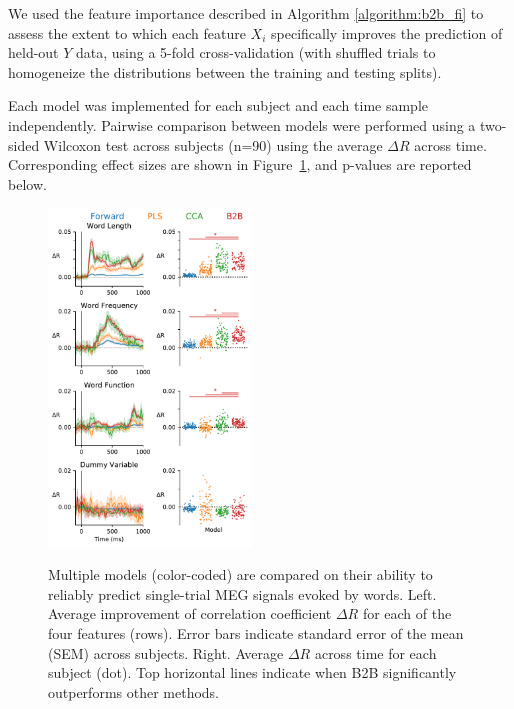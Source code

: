 We used the feature importance described in Algorithm \ref{algorithm:b2b_fi} to assess the extent to which each feature $X_i$ specifically improves the prediction of held-out $Y$ data, using a 5-fold cross-validation (with shuffled trials to homogeneize the distributions between the training and testing splits).

Each model was implemented for each subject and each time sample independently. Pairwise comparison between models were performed using a two-sided Wilcoxon test across subjects (n=90) using the average $\Delta R$ across time. Corresponding effect sizes are shown in Figure~\ref{fig:meg_results}, and p-values are reported below.



\begin{figure}
  \vspace{-11ex}
  \begin{center}
    \includegraphics[width=0.48\textwidth, trim=0cm 0cm 0cm 0cm, clip=True]{figures/meg.pdf}

    \label{fig:meg_results}
  \end{center}
  \caption{Multiple models (color-coded) are compared on their ability to reliably predict single-trial MEG signals evoked by words. Left. Average improvement of correlation coefficient $\Delta R$ for each of the four features (rows). Error bars indicate standard error of the mean (SEM) across subjects. Right. Average $\Delta R$ across time for each subject (dot). Top horizontal lines indicate when B2B significantly outperforms other methods.}
  \vspace{-6ex}
\end{figure}

